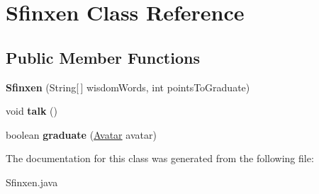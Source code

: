 \hypertarget{class_sfinxen}{}\section{Sfinxen Class Reference}
\label{class_sfinxen}
\subsection*{Public Member Functions}
\begin{DoxyCompactItemize}
\item 
\hypertarget{class_sfinxen_a8aca78bdc58a388ee023a2cf1055fab3}{}{\bfseries Sfinxen} (String\mbox{[}$\,$\mbox{]} wisdom\+Words, int points\+To\+Graduate)\label{class_sfinxen_a8aca78bdc58a388ee023a2cf1055fab3}

\item 
\hypertarget{class_sfinxen_a873e3e3f24ca14bbfe32b5a3abd3f128}{}void {\bfseries talk} ()\label{class_sfinxen_a873e3e3f24ca14bbfe32b5a3abd3f128}

\item 
\hypertarget{class_sfinxen_a9c3a358e593e12655bc2ef1e44ba984e}{}boolean {\bfseries graduate} (\hyperlink{class_avatar}{Avatar} avatar)\label{class_sfinxen_a9c3a358e593e12655bc2ef1e44ba984e}

\end{DoxyCompactItemize}


The documentation for this class was generated from the following file\+:\begin{DoxyCompactItemize}
\item 
Sfinxen.\+java\end{DoxyCompactItemize}
